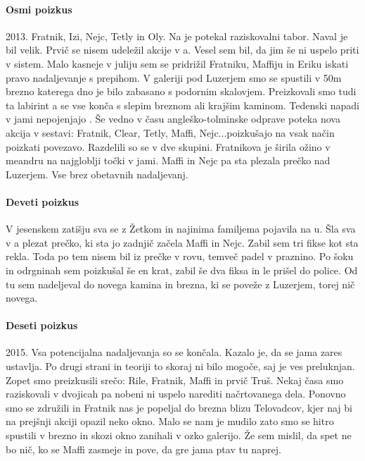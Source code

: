 \paragraph{Osmi poizkus} 2013. Fratnik, Izi, Nejc, Tetly in Oly. Na  je potekal raziskovalni tabor. Naval je bil velik. Prvič se nisem udeležil akcije v a. Vesel sem bil, da jim še ni uspelo priti v sistem. Malo kasneje v juliju sem se pridrižil Fratniku, Maffiju in Eriku iskati pravo nadaljevanje s prepihom.  V galeriji pod Luzerjem smo se spustili v 50m brezno  katerega dno je bilo zabasano s podornim skalovjem. Preizkovali smo tudi ta labirint a se vse konča s slepim breznom ali krajšim kaminom. Tedenski napadi v jami nepojenjajo . Še vedno v času angleško-tolminske odprave poteka nova akcija v sestavi:  Fratnik, Clear, Tetly, Maffi, Nejc...poizkušajo na vsak način poizkati povezavo. Razdelili so se v dve skupini. Fratnikova je širila ožino v meandru na najgloblji točki v jami. Maffi in Nejc pa sta plezala prečko nad Luzerjem. Vse brez obetavnih nadaljevanj. 

\paragraph{Deveti poizkus} V jesenskem zatišju sva se z Žetkom in najinima familjema pojavila na u. Šla sva v a plezat prečko, ki sta jo zadnjič začela Maffi in Nejc. Zabil sem tri fikse kot sta rekla. Toda po tem nisem bil iz prečke v rovu,  temveč padel v praznino. Po šoku in odrgninah sem poizkušal še en krat, zabil še dva fiksa in le prišel do police. Od tu sem nadeljeval do novega kamina in brezna, ki se poveže z Luzerjem, torej nič novega. 

\paragraph{Deseti poizkus} 2015. Vsa potencijalna nadaljevanja so se končala. Kazalo je, da se jama zares ustavlja. Po drugi strani in teoriji to skoraj ni bilo mogoče, saj je  ves preluknjan. Zopet smo preizkusili srečo: Rile, Fratnik, Maffi in prvič Truš. Nekaj časa smo raziskovali v dvojicah pa nobeni ni uspelo narediti načrtovanega dela. Ponovno smo se združili in Fratnik nas je popeljal do brezna blizu Telovadcov, kjer naj bi na prejšnji akciji opazil neko okno. Malo se nam je mudilo zato smo se hitro spustili v brezno in skozi okno zanihali v ozko galerijo. Že sem mislil, da spet ne bo nič, ko se Maffi zasmeje in pove, da gre jama ptav tu naprej. 

